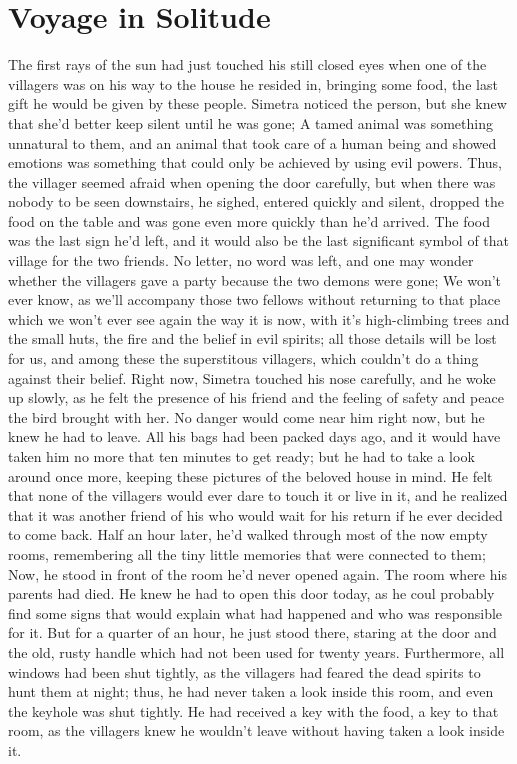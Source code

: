 \chapter{Voyage in Solitude}
\label{cha:voyage-solitude}
The first rays of the sun had just touched his still closed eyes when one of the villagers was on his way to the house he resided in, bringing some food, the last gift he would be given by these people. Simetra noticed the person, but she knew that she'd better keep silent until he was gone; A tamed animal was something unnatural to them, and an animal that took care of a human being and showed emotions was something that could only be achieved by using evil powers. 
Thus, the villager seemed afraid when opening the door carefully, but when there was nobody to be seen downstairs, he sighed, entered quickly and silent, dropped the food on the table and was gone even more quickly than he'd arrived. 
The food was the last sign he'd left, and it would also be the last significant symbol of that village for the two friends. No letter, no word was left, and one may wonder whether the villagers gave a party because the two demons were gone; We won't ever know, as we'll accompany those two fellows without returning to that place which we won't ever see again the way it is now, with it's high-climbing trees and the small huts, the fire and the belief in evil spirits; all those details will be lost for us, and among these the superstitous villagers, which couldn't do a thing against their belief. 
Right now, Simetra touched his nose carefully, and he woke up slowly, as he felt the presence of his friend and the feeling of safety and peace the bird brought with her. No danger would come near him right now, but he knew he had to leave. All his bags had been packed days ago, and it would have taken him no more that ten minutes to get ready; but he had to take a look around once more, keeping these pictures of the beloved house in mind. He felt that none of the villagers would ever dare to touch it or live in it, and he realized that it was another friend of his who would wait for his return if he ever decided to come back. 
Half an hour later, he'd walked through most of the now empty rooms, remembering all the tiny little memories that were connected to them; Now, he stood in front of the room he'd never opened again. 
The room where his parents had died. 
He knew he had to open this door today, as he coul probably find some signs that would explain what had happened and who was responsible for it. 
But for a quarter of an hour, he just stood there, staring at the door and the old, rusty handle which had not been used for twenty years. Furthermore, all windows had been shut tightly, as the villagers had feared the dead spirits to hunt them at night; thus, he had never taken a look inside this room, and even the keyhole was shut tightly. He had received a key with the food, a key to that room, as the villagers knew he wouldn't leave without having taken a look inside it. 
